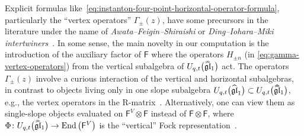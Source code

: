 \documentclass[pdftex]{sigma}%
\numberwithin{equation}{section}
\renewcommand{\hat}[1]{\widehat{#1}}
\newcommand{\hhat}[1]{\hat{\vphantom{\rule{1pt}{5.5pt}}\smash{\hat{#1}}}}
\newcommand{\lie}[1]{\mathfrak{#1}}
\newcommand{\sF}{\mathsf{F}}
\DeclareMathOperator{\End}{End}
\begin{document}
\begin{MyParagraph}
Explicit formulas like~\eqref{eq:instanton-four-point-horizontal-operator-formula},
particularly the ``vertex operators'' $\Gamma_\pm(z)$, have some
precursors in the literature under the name of {\it
 Awata--Feigin--Shiraishi} or {\it Ding--Iohara--Miki intertwiners}~\cite{Awata2012}. In some sense, the main novelty in our computation
is the introduction of the auxiliary factor of $\sF$ where the
operators $H_{\pm n}$ (in \eqref{eq:gamma-vertex-operators}) from the
vertical subalgebra of $U_{q,t}\big(\hhat{\lie{gl}}_1\big)$ act. The
operators $\Gamma_\pm(z)$ involve a curious interaction of the
vertical and horizontal subalgebras, in contrast to objects living
only in one slope subalgebra
$U_{q,t}\big(\hat{\lie{gl}}_1\big) \subset U_{q,t}\big(\hhat{\lie{gl}}_1\big)$, e.g.,
the vertex operators in the R-matrix~\cite{Negut2015}. Alternatively,
one can view them as single-slope objects evaluated on
$\sF^V \otimes \sF$ instead of $\sF \otimes \sF$, where
$\Phi\colon U_{q,t}\big(\hhat{\lie{gl}}_1\big) \to \End\big(\sF^V\big)$ is the
``vertical'' Fock representation~\cite{Negut2020}.
\end{MyParagraph}
\end{document}
